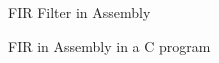 \documentclass{beamer}
\begin{document}
\begin{frame}{FIR Filter in Assembly}
    \begin{center}
        {\tiny
            
        }
    \end{center}
\end{frame}

\begin{frame}{FIR in Assembly in a C program}
    \begin{center}
        {\tiny
            
        }
    \end{center}
\end{frame}
\end{document}
